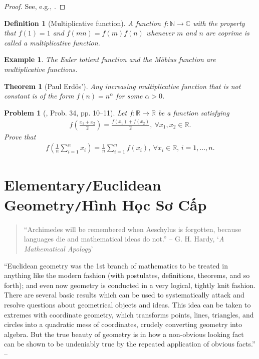 \documentclass[oneside]{book}
\numberwithin{equation}{section}
\newtheorem{definition}{Definition}[section]
\newtheorem{theorem}{Theorem}[section]
\newtheorem{example}{Example}[section]
\newtheorem{problem}{Problem}[section]
\begin{document}
\begin{proof}[Proof]
	See, e.g., \cite[p. 8]{Gelca_Andreescu2017}.
\end{proof}

\begin{definition}[Multiplicative function]
	A function $f:\mathbb{N}\to\mathbb{C}$ with the property that $f(1) = 1$ and $f(mn) = f(m)f(n)$ whenever $m$ and $n$ are coprime is called a \emph{multiplicative function}.
\end{definition}

\begin{example}
	The \emph{Euler totient function} and the \emph{M\"obius function} are multiplicative functions.
\end{example}

\begin{theorem}[Paul Erd\"os']
	Any increasing multiplicative function that is not constant is of the form $f(n) = n^\alpha$ for some $\alpha > 0$.
\end{theorem}

\begin{problem}[\cite{Gelca_Andreescu2017}, Prob. 34, pp. 10--11]
	Let $f:\mathbb{R}\to\mathbb{R}$ be a function satisfying
	\begin{align*}
		f\left(\frac{x_1 + x_2}{2}\right) = \frac{f(x_1) + f(x_2)}{2},\ \forall x_1,x_2\in\mathbb{R}.
	\end{align*}
	Prove that
	\begin{align*}
		f\left(\frac{1}{n}\sum_{i=1}^n x_i\right) = \frac{1}{n}\sum_{i=1}^n f(x_i),\ \forall x_i\in\mathbb{R},\,i = 1,\ldots,n.
	\end{align*}
\end{problem}


\chapter{Elementary\texttt{/}Euclidean Geometry\texttt{/}Hình Học Sơ Cấp}
\begin{quotation}
	``Archimedes will be remembered when Aeschylus is forgotten, because languages die and mathematical ideas do not.'' -- G. H. Hardy, `\textit{A Mathematical Apology}'
\end{quotation}
``Euclidean geometry was the 1st branch of mathematics to be treated in anything like the modern fashion (with postulates, definitions, theorems, and so forth); and even now geometry is conducted in a very logical, tightly knit fashion. There are several basic results which can be used to systematically attack and resolve questions about geometrical objects and ideas. This idea can be taken to extremes with coordinate geometry, which transforms points, lines, triangles, and circles into a quadratic mess of coordinates, crudely converting geometry into algebra. But the true beauty of geometry is in how a non-obvious looking fact can be shown to be undeniably true by the repeated application of obvious facts.'' -- \cite[Chap. 4, p. 49]{Tao2006}
\end{document}
